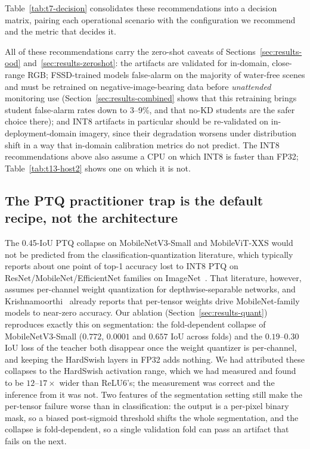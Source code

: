 Table~\ref{tab:t7-decision} consolidates these recommendations into a decision matrix, pairing each operational scenario with the configuration we recommend and the metric that decides it.

All of these recommendations carry the zero-shot caveats of Sections~\ref{sec:results-ood} and~\ref{sec:results-zeroshot}: the artifacts are validated for in-domain, close-range RGB; FSSD-trained models false-alarm on the majority of water-free scenes and must be retrained on negative-image-bearing data before \emph{unattended} monitoring use (Section~\ref{sec:results-combined} shows that this retraining brings student false-alarm rates down to 3--9\%, and that no-KD students are the safer choice there); and INT8 artifacts in particular should be re-validated on in-deployment-domain imagery, since their degradation worsens under distribution shift in a way that in-domain calibration metrics do not predict. The INT8 recommendations above also assume a CPU on which INT8 is faster than FP32; Table~\ref{tab:t13-host2} shows one on which it is not.



\subsection{The PTQ practitioner trap is the default recipe, not the architecture}
\label{sec:discussion-ptq-trap}

The 0.45-IoU PTQ collapse on MobileNetV3-Small and MobileViT-XXS would not be predicted from the classification-quantization literature, which typically reports about one point of top-1 accuracy lost to INT8 PTQ on ResNet/MobileNet/EfficientNet families on ImageNet~\cite{krishnamoorthi2018quantizing,jacob2018quantization}. That literature, however, assumes per-channel weight quantization for depthwise-separable networks, and Krishnamoorthi~\cite{krishnamoorthi2018quantizing} already reports that per-tensor weights drive MobileNet-family models to near-zero accuracy. Our ablation (Section~\ref{sec:results-quant}) reproduces exactly this on segmentation: the fold-dependent collapse of MobileNetV3-Small ($0.772$, $0.0001$ and $0.657$ IoU across folds) and the $0.19$--$0.30$ IoU loss of the teacher both disappear once the weight quantizer is per-channel, and keeping the HardSwish layers in FP32 adds nothing. We had attributed these collapses to the HardSwish activation range, which we had measured and found to be $12$--$17\times$ wider than ReLU6's; the measurement was correct and the inference from it was not. Two features of the segmentation setting still make the per-tensor failure worse than in classification: the output is a per-pixel binary mask, so a biased post-sigmoid threshold shifts the whole segmentation, and the collapse is fold-dependent, so a single validation fold can pass an artifact that fails on the next.

